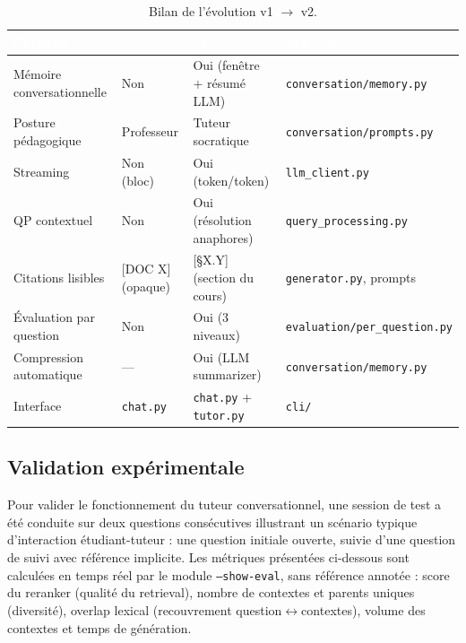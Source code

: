 \begin{table}[H]
\centering
\begin{tabularx}{\linewidth}{L{4.8cm} C{2.5cm} C{2.5cm} L{3cm}}
\toprule
{}
\textcolor{white}{\textbf{Capacité}} &
\textcolor{white}{\textbf{v1}} &
\textcolor{white}{\textbf{v2}} &
\textcolor{white}{\textbf{Module}} \\
\midrule
Mémoire conversationnelle      & Non           & Oui (fenêtre + résumé LLM) & \texttt{conversation/memory.py} \\
Posture pédagogique            & Professeur    & Tuteur socratique          & \texttt{conversation/prompts.py} \\
Streaming                      & Non (bloc)    & Oui (token/token)          & \texttt{llm\_client.py} \\
QP contextuel                  & Non           & Oui (résolution anaphores) & \texttt{query\_processing.py} \\
Citations lisibles             & [DOC X] (opaque) & [\S{}X.Y] (section du cours) & \texttt{generator.py}, prompts \\
Évaluation par question        & Non           & Oui (3 niveaux)            & \texttt{evaluation/per\_question.py} \\
Compression automatique        & ---           & Oui (LLM summarizer)       & \texttt{conversation/memory.py} \\
Interface                      & \texttt{chat.py} & \texttt{chat.py} + \texttt{tutor.py} & \texttt{cli/} \\
\bottomrule
\end{tabularx}
\caption{Bilan de l'évolution v1 $\rightarrow$ v2.}
\label{tab:bilan-v2}
\end{table}

\subsection{Validation expérimentale}
\label{sec:validation-v2}

Pour valider le fonctionnement du tuteur conversationnel, une session de test a été conduite sur deux questions consécutives illustrant un scénario typique d'interaction étudiant-tuteur : une question initiale ouverte, suivie d'une question de suivi avec référence implicite. Les métriques présentées ci-dessous sont calculées en temps réel par le module \texttt{--show-eval}, sans référence annotée : score du reranker (qualité du retrieval), nombre de contextes et parents uniques (diversité), overlap lexical (recouvrement question$\leftrightarrow$contextes), volume des contextes et temps de génération.


